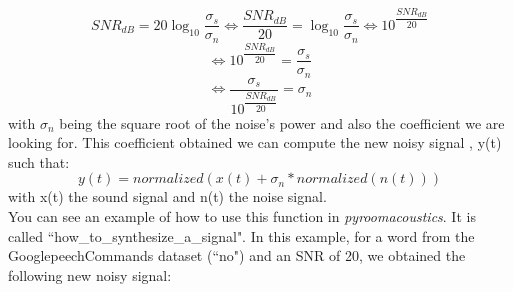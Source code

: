 \documentclass[11pt,a4paper,titlepage]{report}
\begin{document}
\begin{equation}
SNR_{dB} = 20\log_{10}{\dfrac{\sigma_{s}}{\sigma_{n}}} \Leftrightarrow \dfrac{SNR_{dB}}{20} = \log_{10}{\dfrac{\sigma_{s}}{\sigma_{n}}} \Leftrightarrow 10^{\dfrac{SNR_{dB}}{20}}
\end{equation}
\begin{equation}
\Leftrightarrow 10^{\dfrac{SNR_{dB}}{20}} = \dfrac{\sigma_{s}}{\sigma_{n}}
\end{equation}
\begin{equation}
\Leftrightarrow \dfrac{\sigma_{s}}{10^{\dfrac{SNR_{dB}}{20}}} = \sigma_{n}
\end{equation}
with $\sigma_{n}$ being the square root of the noise's power and also the coefficient we are looking for. This coefficient obtained we can compute the new noisy signal , y(t) such that:
\begin{equation}
y(t) = normalized(x(t) + \sigma_{n} * normalized(n(t)) )
\end{equation}
with x(t) the sound signal and n(t) the noise signal.\\
\hspace*{0.6cm}
You can see an example of how to use this function in \textit{pyroomacoustics}. It is called ``how\_to\_synthesize\_a\_signal". In this example, for a word from the GooglepeechCommands dataset (``no") and an SNR of 20, we obtained the following new noisy signal:
\end{document}
